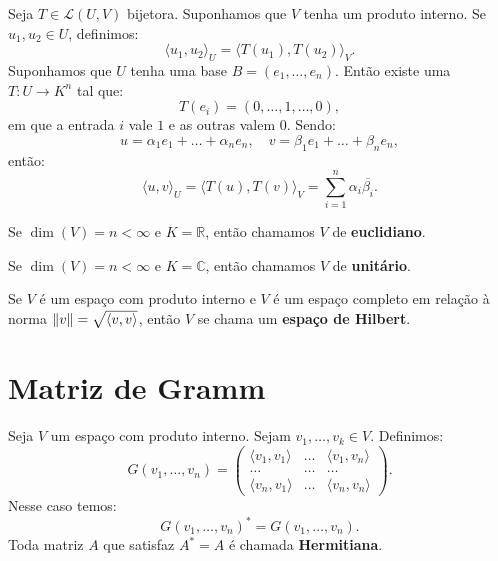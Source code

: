 \documentclass[11pt,twoside,a4paper]{book}
\begin{document}
\begin{exemplo}
Seja $T\in\mathcal{L}(U,V)$ bijetora. Suponhamos que $V$ tenha um produto interno. Se $u_1,u_2\in U$, definimos:
\[
\langle u_1,u_2\rangle_U=\langle T(u_1),T(u_2)\rangle_V.
\]
Suponhamos que $U$ tenha uma base $B=(e_1,\dots,e_n)$. Então existe uma $T:U\rightarrow K^n$ tal que:
\[
T(e_i)=(0,\dots,1,\dots,0),
\]
em que a entrada $i$ vale $1$ e as outras valem $0$. Sendo:
\[
u=\alpha_1e_1+\dots+\alpha_ne_n,\quad v=\beta_1e_1+\dots+\beta_ne_n,
\]
então:
\[
\langle u,v\rangle_U=\langle T(u),T(v)\rangle_V=\sum_{i=1}^n\alpha_i\overline{\beta_i}.
\]
\end{exemplo}

\begin{definicao}
Se $\dim(V)=n<\infty$ e $K=\mathbb{R}$, então chamamos $V$ de \textbf{euclidiano}.

\smallskip
\noindent
Se $\dim(V)=n<\infty$ e $K=\mathbb{C}$, então chamamos $V$ de \textbf{unitário}.
\end{definicao}

\begin{definicao}
Se $V$ é um espaço com produto interno e $V$ é um espaço completo em relação à norma $\norm{v}=\sqrt{\langle v,v\rangle}$, então $V$ se chama um \textbf{espaço de Hilbert}.
\end{definicao}

\section{Matriz de Gramm}

\begin{definicao}
Seja $V$ um espaço com produto interno. Sejam $v_1,\dots,v_k\in V$. Definimos:
\[
G(v_1,\dots,v_n)=\begin{pmatrix}
\langle v_1,v_1\rangle&\dots&\langle v_1,v_n\rangle\\\dots&\dots&\dots\\\langle v_n,v_1\rangle&\dots&\langle v_n,v_n\rangle
\end{pmatrix}.
\]
Nesse caso temos:
\[
G(v_1,\dots,v_n)^*=G(v_1,\dots,v_n).
\]
Toda matriz $A$ que satisfaz $A^*=A$ é chamada \textbf{Hermitiana}.
\end{definicao}
\end{document}
